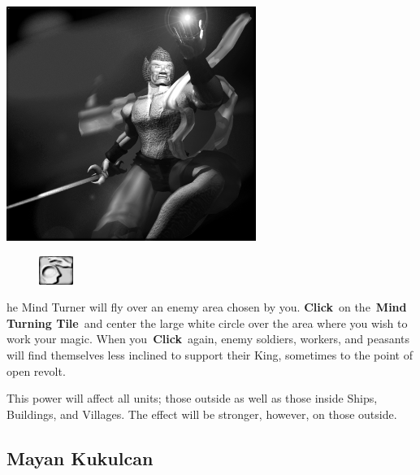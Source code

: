 \begin{center}
	\includegraphics[width=.9\linewidth]{Amindturner}
\end{center}

\begin{figure}
	\vspace{-20pt}
	\begin{center}
		\includegraphics[width=0.1\textwidth]{Tmindturn}
	\end{center}
	\vspace{-20pt}
\end{figure}

he Mind Turner will fly over an enemy area chosen by you. \textbf{Click} on the \textbf{Mind Turning Tile} and center the large white circle over the area where you wish to work your magic. When you \textbf{Click} again, enemy soldiers, workers, and peasants will find themselves less inclined to support their King, sometimes to the point of open revolt.

This power will affect all units; those outside as well as those inside Ships, Buildings, and Villages. The effect will be stronger, however, on those outside.

\subsection{Mayan Kukulcan}

